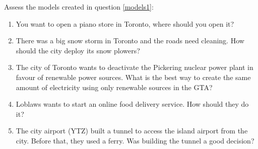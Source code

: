 \begin{exercises}
	\begin{problist}
	\prob
	Assess the models created in question \ref{models1}:

	\begin{enumerate}
		\item You want to open a piano store in Toronto, where should you open it?
		\item There was a big snow storm in Toronto and the roads need cleaning. How should the city deploy its snow plowers?
		\item The city of Toronto wants to deactivate the Pickering nuclear power plant in favour of renewable power sources. What is the best way to create the same amount of electricity using only renewable sources in the GTA?
		\item Loblaws wants to start an online food delivery service. How should they do it?
		\item The city airport (YTZ) built a tunnel to access the island airport from the city. Before that, they used a ferry. Was building the tunnel a good decision?	
	\end{enumerate}
	\end{problist}
\end{exercises}
